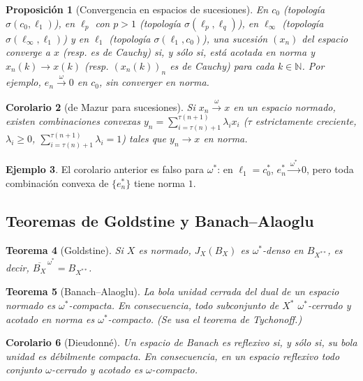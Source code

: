\documentclass[11pt,a4paper]{article}
\newcommand{\N}{\mathbb{N}}
\newcommand{\wto}{\xrightarrow{\ \omega\ }}
\newcommand{\wsto}{\xrightarrow{\ \omega^*\ }}
\newcommand{\wscl}[1]{\overline{#1}^{\,\omega^*}}
\newcommand{\BX}{B_X}
\theoremstyle{plain}
\newtheorem{teorema}{Teorema}[section]
\newtheorem{proposicion}[teorema]{Proposición}
\newtheorem{corolario}[teorema]{Corolario}
\theoremstyle{definition}
\newtheorem{ejemplo}[teorema]{Ejemplo}
\theoremstyle{remark}
\begin{document}
\begin{proposicion}[Convergencia en espacios de sucesiones]
En $c_0$ (topología $\sigma(c_0,\ell_1)$), en $\ell_p$ con $p>1$ (topología $\sigma(\ell_p,\ell_q)$), en $\ell_\infty$ (topología $\sigma(\ell_\infty,\ell_1)$) y en $\ell_1$ (topología $\sigma(\ell_1,c_0)$), una sucesión $(x_n)$ del espacio converge a $x$ (resp. es de Cauchy) si, y sólo si, está acotada en norma y $x_n(k)\to x(k)$ (resp. $(x_n(k))_n$ es de Cauchy) para cada $k\in\N$. Por ejemplo, $e_n\wto 0$ en $c_0$, sin converger en norma.
\end{proposicion}

\begin{corolario}[de Mazur para sucesiones]
Si $x_n\wto x$ en un espacio normado, existen combinaciones convexas $y_n=\sum_{i=\tau(n)+1}^{\tau(n+1)}\lambda_i x_i$ ($\tau$ estrictamente creciente, $\lambda_i\ge0$, $\sum_{i=\tau(n)+1}^{\tau(n+1)}\lambda_i=1$) tales que $y_n\to x$ en norma.
\end{corolario}

\begin{ejemplo}
El corolario anterior es falso para $\omega^*$: en $\ell_1=c_0^*$, $e_n^*\wsto0$, pero toda combinación convexa de $\{e_n^*\}$ tiene norma $1$.
\end{ejemplo}

\subsection{Teoremas de Goldstine y Banach--Alaoglu}

\begin{teorema}[Goldstine]
Si $X$ es normado, $J_X(\BX)$ es $\omega^*$-denso en $B_{X^{**}}$, es decir, $\wscl{\BX}=B_{X^{**}}$.
\end{teorema}

\begin{teorema}[Banach--Alaoglu]
La bola unidad cerrada del dual de un espacio normado es $\omega^*$-compacta. En consecuencia, todo subconjunto de $X^*$ $\omega^*$-cerrado y acotado en norma es $\omega^*$-compacto. (Se usa el teorema de Tychonoff.)
\end{teorema}

\begin{corolario}[Dieudonné]
Un espacio de Banach es reflexivo si, y sólo si, su bola unidad es débilmente compacta. En consecuencia, en un espacio reflexivo todo conjunto $\omega$-cerrado y acotado es $\omega$-compacto.
\end{corolario}
\end{document}
